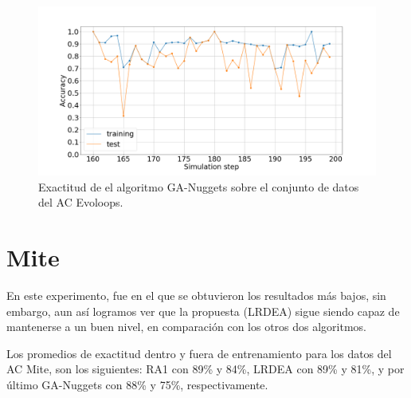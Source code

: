 \begin{figure}[H]
	\centering
	\includegraphics[width=\linewidth]{fig/GA-nuggets_8}
	\caption{Exactitud de el algoritmo GA-Nuggets sobre el conjunto de datos del AC Evoloops.}
	\label{fig:ganuggetsevoloops}
\end{figure}

\section{Mite}
En este experimento, fue en el que se obtuvieron los resultados más bajos, sin embargo, aun así logramos ver que la propuesta (LRDEA) sigue siendo capaz de mantenerse a un buen nivel, en comparación con los otros dos algoritmos.

Los promedios de exactitud dentro y fuera de entrenamiento para los datos del AC Mite, son los siguientes: RA1 con 89\% y 84\%, LRDEA con 89\% y 81\%, y por último GA-Nuggets con 88\% y 75\%, respectivamente.

